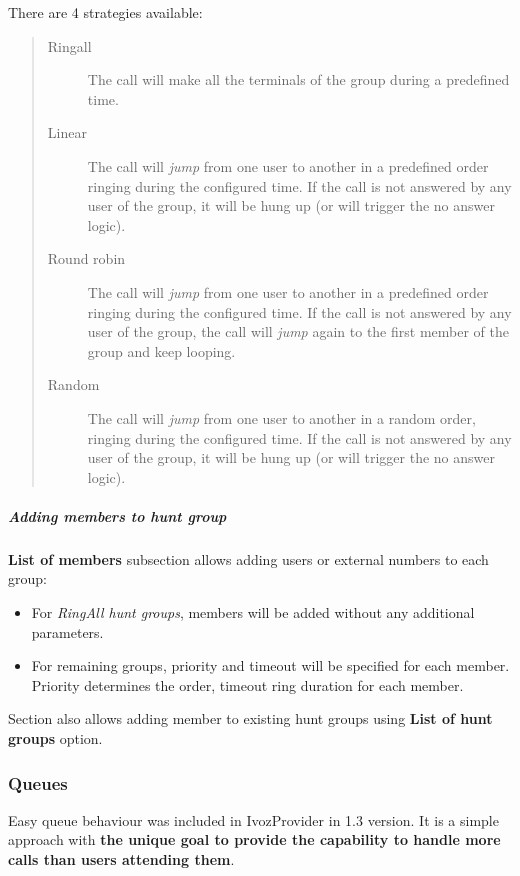 \documentclass[letterpaper,10pt,english]{sphinxmanual}
\begin{document}
There are 4 strategies available:
\begin{quote}
\begin{description}
\item[{Ringall}] \leavevmode
The call will make all the terminals of the group during a predefined
time.

\item[{Linear}] \leavevmode
The call will \emph{jump} from one user to another in a predefined order
ringing during the configured time. If the call is not answered by any
user of the group, it will be hung up (or will trigger the no answer logic).

\item[{Round robin}] \leavevmode
The call will \emph{jump} from one user to another in a predefined order
ringing during the configured time. If the call is not answered by any
user of the group, the call will \emph{jump} again to the first member of the
group and keep looping.

\item[{Random}] \leavevmode
The call will \emph{jump} from one user to another in a random order,
ringing during the configured time.  If the call is not answered by any
user of the group, it will be hung up (or will trigger the no answer logic).

\end{description}
\end{quote}


\subparagraph{Adding members to hunt group}
\label{administration_portal/client/vpbx/routing_endpoints/hunt_groups:adding-members-to-hunt-group}
\textbf{List of members} subsection allows adding users or external numbers to each group:
\begin{itemize}
\item {} 
For \emph{RingAll hunt groups}, members will be added without any additional parameters.

\item {} 
For remaining groups, priority and timeout will be specified for each member. Priority determines the order, timeout ring
duration for each member.

\end{itemize}

Section {\hyperref[administration_portal/client/vpbx/users:users]{}} also allows adding member to existing hunt groups using \textbf{List of hunt groups} option.


\subsubsection{Queues}
\label{administration_portal/client/vpbx/routing_endpoints/queues:queues}\label{administration_portal/client/vpbx/routing_endpoints/queues::doc}\label{administration_portal/client/vpbx/routing_endpoints/queues:id1}
Easy queue behaviour was included in IvozProvider in 1.3 version. It is a simple
approach with \textbf{the unique goal to provide the capability to handle more calls
than users attending them}.
\end{document}
